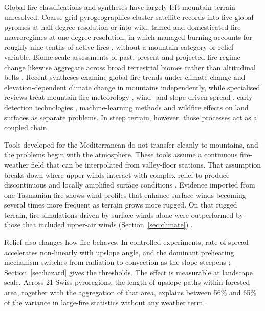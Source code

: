 \documentclass[11pt,a4paper]{article}
\begin{document}
Global fire classifications and syntheses have largely left mountain terrain unresolved. Coarse-grid pyrogeographies cluster satellite records into five global pyromes at half-degree resolution \citep{archibald_defining_2013} or into wild, tamed and domesticated fire macroregimes at one-degree resolution, in which managed burning accounts for roughly nine tenths of active fires \citep{pereira_wild_2022}, without a mountain category or relief variable. Biome-scale assessments of past, present and projected fire-regime change likewise aggregate across broad terrestrial biomes rather than altitudinal belts \citep{sayedi_assessing_2024}. Recent syntheses examine global fire trends under climate change \citep{jones_global_2022} and elevation-dependent climate change in mountains \citep{pepin_climate_2022} independently, while specialised reviews treat mountain fire meteorology \citep{sharples_overview_2009}, wind- and slope-driven spread \citep{hayajneh_wind_2026}, early detection technologies \citep{mohapatra_early_2022}, machine-learning methods \citep{jain_review_2020} and wildfire effects on land surfaces \citep{or_review_2023} as separate problems. In steep terrain, however, those processes act as a coupled chain.

Tools developed for the Mediterranean do not transfer cleanly to mountains, and the problems begin with the atmosphere. These tools assume a continuous fire-weather field that can be interpolated from valley-floor stations. That assumption breaks down where upper winds interact with complex relief to produce discontinuous and locally amplified surface conditions \citep{sharples_overview_2009}. Evidence imported from one Tasmanian fire shows wind profiles that enhance surface winds becoming several times more frequent as terrain grows more rugged. On that rugged terrain, fire simulations driven by surface winds alone were outperformed by those that included upper-air winds (Section~\ref{sec:climate}) \citep{ozaki_impact_2022}.

Relief also changes how fire behaves. In controlled experiments, rate of spread accelerates non-linearly with upslope angle, and the dominant preheating mechanism switches from radiation to convection as the slope steepens \citep{hayajneh_wind_2026}; Section~\ref{sec:hazard} gives the thresholds. The effect is measurable at landscape scale. Across 21 Swiss pyroregions, the length of upslope paths within forested area, together with the aggregation of that area, explains between 56\% and 65\% of the variance in large-fire statistics without any weather term \citep{conedera_linking_2024}.
\end{document}
